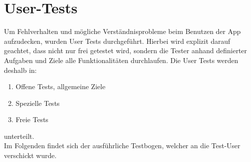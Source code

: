 \section{User-Tests}
Um Fehlverhalten und mögliche Verständnisprobleme beim Benutzen der App aufzudecken, wurden User Tests durchgeführt. Hierbei wird explizit darauf geachtet, dass nicht nur frei getestet wird, sondern die Tester anhand definierter Aufgaben und Ziele alle Funktionalitäten durchlaufen. \newline
Die User Tests werden deshalb in:
\begin{enumerate}
    \item Offene Tests, allgemeine Ziele
    \item Spezielle Tests
    \item Freie Tests
\end{enumerate}
unterteilt.\\ Im Folgenden findet sich der ausführliche Testbogen, welcher an die Test-User verschickt wurde.
